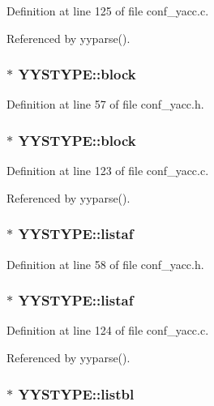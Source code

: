 Definition at line 125 of file conf\_\-yacc.c.

Referenced by yyparse().
\subsubsection{$\ast$ {\bf YYSTYPE::block}}\label{unionYYSTYPE_o6}




Definition at line 57 of file conf\_\-yacc.h.
\subsubsection{$\ast$ {\bf YYSTYPE::block}}\label{unionYYSTYPE_o2}




Definition at line 123 of file conf\_\-yacc.c.

Referenced by yyparse().
\subsubsection{$\ast$ {\bf YYSTYPE::listaf}}\label{unionYYSTYPE_o7}




Definition at line 58 of file conf\_\-yacc.h.
\subsubsection{$\ast$ {\bf YYSTYPE::listaf}}\label{unionYYSTYPE_o3}




Definition at line 124 of file conf\_\-yacc.c.

Referenced by yyparse().
\subsubsection{$\ast$ {\bf YYSTYPE::listbl}}\label{unionYYSTYPE_o5}




